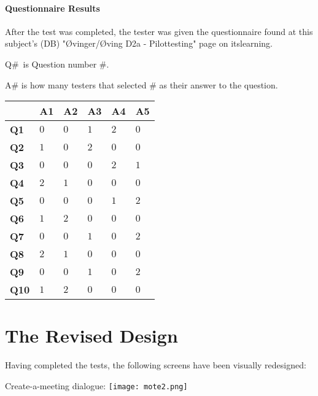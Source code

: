 \documentclass{article}
\begin{document}
\subsection{Questionnaire Results}

After the test was completed, the tester was given the questionnaire found
at this subject's (DB) "\O vinger/\O ving D2a - Pilottesting" page on
itslearning.

Q\#\ is Question number \#.

A\# is how many testers that selected \# as their answer to the question.

\begin{tabular}{|l|l|l|l|l|l|}
\hline
& \textbf{A1} & \textbf{A2} & \textbf{A3} & \textbf{A4} & \textbf{A5} \\ 
\hline
\textbf{Q1} & $0$ & $0$ & $1$ & $2$ & $0$ \\ \hline
\textbf{Q2} & $1$ & $0$ & $2$ & $0$ & $0$ \\ \hline
\textbf{Q3} & $0$ & $0$ & $0$ & $2$ & $1$ \\ \hline
\textbf{Q4} & $2$ & $1$ & $0$ & $0$ & $0$ \\ \hline
\textbf{Q5} & $0$ & $0$ & $0$ & $1$ & $2$ \\ \hline
\textbf{Q6} & $1$ & $2$ & $0$ & $0$ & $0$ \\ \hline
\textbf{Q7} & $0$ & $0$ & $1$ & $0$ & $2$ \\ \hline
\textbf{Q8} & $2$ & $1$ & $0$ & $0$ & $0$ \\ \hline
\textbf{Q9} & $0$ & $0$ & $1$ & $0$ & $2$ \\ \hline
\textbf{Q10} & $1$ & $2$ & $0$ & $0$ & $0$ \\ \hline
\end{tabular}
\newpage
\part{The Revised Design}

Having completed the tests, the following screens have been visually
redesigned:

Create-a-meeting dialogue: \newline \texttt{[image: mote2.png]}\newline
\end{document}
